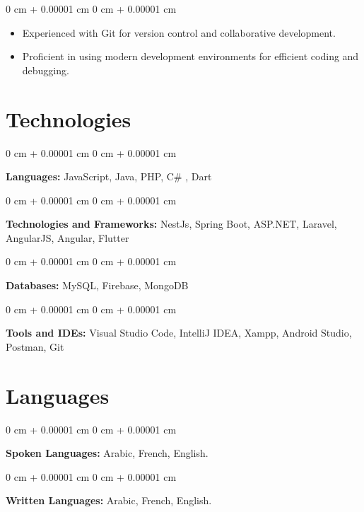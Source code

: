 \documentclass[10pt, letterpaper]{article}
\newenvironment{highlights}{
    \begin{itemize}[
        topsep=0.10 cm,
        parsep=0.10 cm,
        partopsep=0pt,
        itemsep=0pt,
        leftmargin=0 cm + 10pt
    ]
}{
    \end{itemize}
} %
\newenvironment{onecolentry}{
    \begin{adjustwidth}{
        0 cm + 0.00001 cm
    }{
        0 cm + 0.00001 cm
    }
}{
    \end{adjustwidth}
} %
\begin{document}
                \vspace{0.10 cm}
                \begin{onecolentry}
                    \begin{highlights}
                        \item Experienced with Git for version control and collaborative development.
                        \item Proficient in using modern development environments for efficient coding and debugging.
                    \end{highlights}
            \end{onecolentry}
            
        
        
        
        \section{Technologies}

            \begin{onecolentry}
                \textbf{Languages:} JavaScript, Java, PHP, C\# ,  Dart \end{onecolentry}
            
            \vspace{0.2 cm}
            
            \begin{onecolentry}
                \textbf{Technologies and Frameworks:} NestJs, Spring Boot, ASP.NET, Laravel, AngularJS, Angular, Flutter \end{onecolentry}
            
            \vspace{0.2 cm}
            
            \begin{onecolentry}
                \textbf{Databases:} MySQL, Firebase, MongoDB \end{onecolentry}
            
            \vspace{0.2 cm}
            
            \begin{onecolentry}
                \textbf{Tools and IDEs:} Visual Studio Code, IntelliJ IDEA, Xampp, Android Studio, Postman, Git \end{onecolentry}


        
        \section{Languages}

\begin{onecolentry}
    \textbf{Spoken Languages:} Arabic, French, English.
\end{onecolentry}

\vspace{0.2 cm}

\begin{onecolentry}
    \textbf{Written Languages:} Arabic, French, English.
\end{onecolentry}
\end{document}
